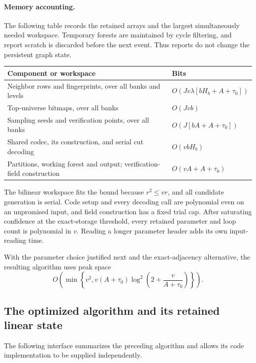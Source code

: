 \documentclass[11pt,letterpaper]{article}
\numberwithin{equation}{section}
\begin{document}
\paragraph{Memory accounting.}
The following table records the retained arrays and the largest simultaneously needed workspace.
Temporary forests are maintained by cycle filtering, and report scratch is discarded before the next event.
Thus reports do not change the persistent graph state.
\begin{center}
\begin{tabularx}{\linewidth}{@{}>{\raggedright\arraybackslash}X l@{}}
\toprule
Component or workspace & Bits\\
\midrule
Neighbor rows and fingerprints, over all banks and levels
  & $O(Jv\lambda[bH_b+A+\tau_0])$\\
Top-universe bitmaps, over all banks
  & $O(Jvb)$\\
Sampling seeds and verification points, over all banks
  & $O(J[bA+A+\tau_0])$\\
Shared codec, its construction, and serial cut decoding
  & $O(vbH_b)$\\
Partitions, working forest and output; verification-field construction
  & $O(vA+A+\tau_0)$\\
\bottomrule
\end{tabularx}
\end{center}
The bilinear workspace fits the bound because $r^2\le vr$, and all candidate generation is serial.
Code setup and every decoding call are polynomial even on an unpromised input, and field construction has a fixed trial cap.
After saturating confidence at the exact-storage threshold, every retained parameter and loop count is polynomial in $v$.
Reading a longer parameter header adds its own input-reading time.

With the parameter choice justified next and the exact-adjacency alternative, the resulting algorithm uses peak space
\begin{equation}
O\left(\min\left\{v^2,
       v(A+\tau_0)\log^2\left(2+\frac v{A+\tau_0}\right)\right\}\right).
 \label{eq:forest-df17}
\end{equation}

\subsection{The optimized algorithm and its retained linear state}
\label{sec:compiler}

The following interface summarizes the preceding algorithm and allows its code implementation to be supplied independently.
\end{document}
